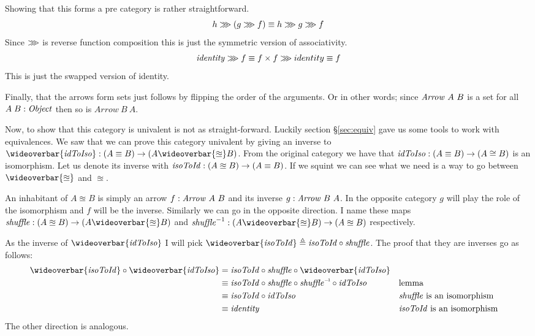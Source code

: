 Showing that this forms a pre category is rather straightforward. 
%
$$
h \ggg (g \ggg f) \equiv h \ggg g \ggg f
$$
%
Since $\ggg$ is reverse function composition this is just the symmetric version
of associativity.
%
$$
\identity \rrr f \equiv f \x f \rrr identity \equiv f
$$
%
This is just the swapped version of identity.

Finally, that the arrows form sets just follows by flipping the order of the
arguments. Or in other words; since $\Arrow\ A\ B$ is a set for all $A\;B \tp
\Object$ then so is $Arrow\ B\ A$.

Now, to show that this category is univalent is not as straight-forward. Luckily
section \S\ref{sec:equiv} gave us some tools to work with equivalences. We saw
that we can prove this category univalent by giving an inverse to
$\wideoverbar{\idToIso} \tp (A \equiv B) \to (A \wideoverbar{\approxeq} B)$.
From the original category we have that $\idToIso \tp (A \equiv B) \to (A \cong
B)$ is an isomorphism. Let us denote its inverse with $\isoToId \tp (A
\approxeq B) \to (A \equiv B)$. If we squint we can see what we need is a way to
go between $\wideoverbar{\approxeq}$ and $\approxeq$.

An inhabitant of $A \approxeq B$ is simply an arrow $f \tp \Arrow\ A\ B$
and its inverse $g \tp \Arrow\ B\ A$. In the opposite category $g$ will
play the role of the isomorphism and $f$ will be the inverse. Similarly we can
go in the opposite direction. I name these maps $\shuffle \tp (A \approxeq
B) \to (A \wideoverbar{\approxeq} B)$ and $\shuffle^{-1} \tp (A
\wideoverbar{\approxeq} B) \to (A \approxeq B)$ respectively.

As the inverse of $\wideoverbar{\idToIso}$ I will pick $\wideoverbar{\isoToId}
\defeq \isoToId \comp \shuffle$. The proof that they are inverses go as
follows:
%
\begin{align*}
\wideoverbar{\isoToId} \comp \wideoverbar{\idToIso} & =
\isoToId \comp \shuffle \comp \wideoverbar{\idToIso}
\\
%
& \equiv
\isoToId \comp \shuffle \comp \inv{\shuffle} \comp \idToIso
&& \text{lemma} \\
& \equiv
\isoToId \comp \idToIso
&& \text{$\shuffle$ is an isomorphism} \\
& \equiv
\identity
&& \text{$\isoToId$ is an isomorphism}
\end{align*}
%
The other direction is analogous.

